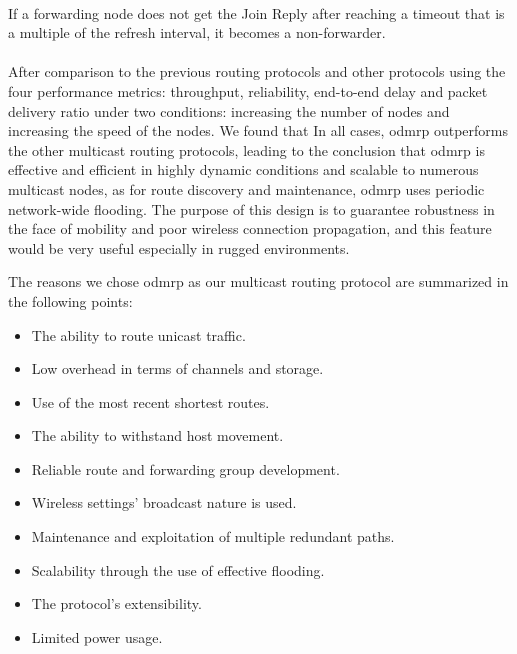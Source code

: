 \\
If a forwarding node does not get the Join Reply after reaching a timeout that is a multiple of the refresh interval, it becomes a non-forwarder. 
\\
\\
After comparison to the previous routing protocols and other protocols using the four performance metrics: throughput, reliability, end-to-end delay and packet delivery ratio under two conditions: increasing the number of nodes and increasing the speed of the nodes. We found that In all cases, \acrshort{odmrp} outperforms the other multicast routing protocols, leading to the conclusion that \acrshort{odmrp} is effective and efficient in highly dynamic conditions and scalable to numerous multicast nodes, as for route discovery and maintenance, \acrshort{odmrp} uses periodic network-wide flooding. The purpose of this design is to guarantee robustness in the face of mobility and poor wireless connection propagation, and this feature would be very useful especially in rugged environments.

The reasons we chose \acrshort{odmrp} as our multicast routing protocol are summarized in the following points:

\begin{itemize}[itemsep=1pt, topsep=5pt]
\item The ability to route unicast traffic.

\item Low overhead in terms of channels and storage.

\item Use of the most recent shortest routes.

\item The ability to withstand host movement.

\item Reliable route and forwarding group development.

\item Wireless settings' broadcast nature is used.

\item Maintenance and exploitation of multiple redundant paths.

\item Scalability through the use of effective flooding.

\item The protocol's extensibility.

\item Limited power usage.
\end{itemize}


